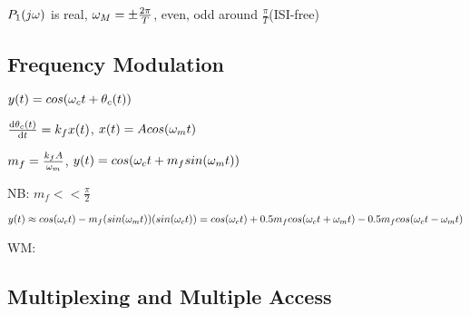 $P_1(j\omega)$ is real, $\omega_M=\pm \frac{2\pi}{T}$, even, odd around $\frac{\pi}{T}$(ISI-free)

\subsection*{Frequency Modulation}
$y(t)=cos(\omega_c t + \theta_c(t))$

$\frac{\mathrm{d} \theta_c(t)}{\mathrm{d} t}=k_f x(t)$,   $x(t)=Acos(\omega_m t)$

$m_f=\frac{k_f A}{\omega_m}$,   $y(t)=cos(\omega_c t + m_f sin(\omega_m t))$

NB: $m_f << \frac{\pi}{2}$

$y(t) \approx cos(\omega_c t)-m_f (sin(\omega_m t))(sin(\omega_c t))\\=cos(\omega_c t) + 0.5m_f cos(\omega_c t + \omega_m t) - 0.5m_f cos(\omega_c t - \omega_m t)$

WM:

\subsection*{Multiplexing and Multiple Access}








